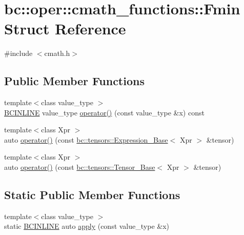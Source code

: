 \hypertarget{structbc_1_1oper_1_1cmath__functions_1_1Fmin}{}\section{bc\+:\+:oper\+:\+:cmath\+\_\+functions\+:\+:Fmin Struct Reference}
\label{structbc_1_1oper_1_1cmath__functions_1_1Fmin}


{\ttfamily \#include $<$cmath.\+h$>$}

\subsection*{Public Member Functions}
\begin{DoxyCompactItemize}
\item 
{\footnotesize template$<$class value\+\_\+type $>$ }\\\hyperlink{common_8h_a6699e8b0449da5c0fafb878e59c1d4b1}{B\+C\+I\+N\+L\+I\+NE} value\+\_\+type \hyperlink{structbc_1_1oper_1_1cmath__functions_1_1Fmin_af12aa0b02156524b71a0b5661ba90a25}{operator()} (const value\+\_\+type \&x) const
\item 
{\footnotesize template$<$class Xpr $>$ }\\auto \hyperlink{structbc_1_1oper_1_1cmath__functions_1_1Fmin_af0d78498cbe0a60da3786c4d25c42f9b}{operator()} (const \hyperlink{classbc_1_1tensors_1_1Expression__Base}{bc\+::tensors\+::\+Expression\+\_\+\+Base}$<$ Xpr $>$ \&tensor)
\item 
{\footnotesize template$<$class Xpr $>$ }\\auto \hyperlink{structbc_1_1oper_1_1cmath__functions_1_1Fmin_a5e68a36c4e28a4a19b78cbe58c0e7fc4}{operator()} (const \hyperlink{classbc_1_1tensors_1_1Tensor__Base}{bc\+::tensors\+::\+Tensor\+\_\+\+Base}$<$ Xpr $>$ \&tensor)
\end{DoxyCompactItemize}
\subsection*{Static Public Member Functions}
\begin{DoxyCompactItemize}
\item 
{\footnotesize template$<$class value\+\_\+type $>$ }\\static \hyperlink{common_8h_a6699e8b0449da5c0fafb878e59c1d4b1}{B\+C\+I\+N\+L\+I\+NE} auto \hyperlink{structbc_1_1oper_1_1cmath__functions_1_1Fmin_a73820f69aafe5a65c82036c81730de35}{apply} (const value\+\_\+type \&x)
\end{DoxyCompactItemize}


